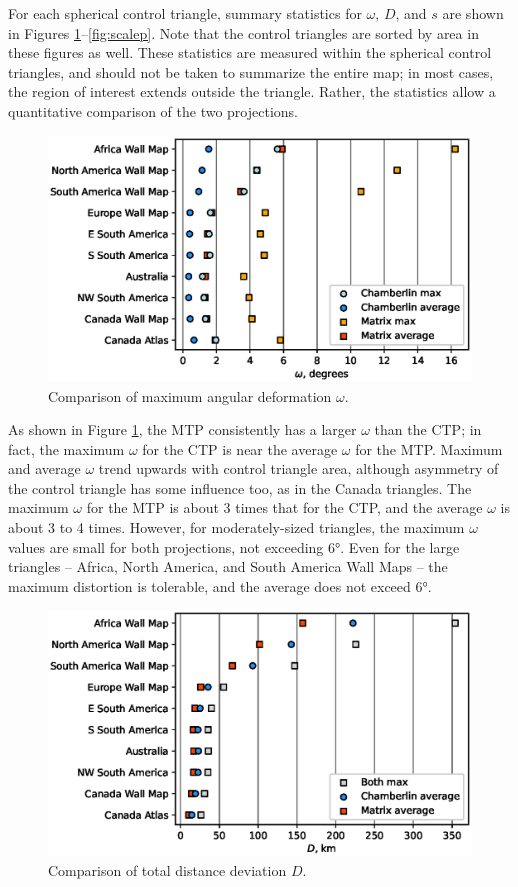 \documentclass[]{interact}
\begin{document}
For each spherical control triangle, summary statistics for $\omega$, $D$, and
$s$ are shown in Figures \ref{fig:omegap}--\ref{fig:scalep}. Note that the
control triangles are sorted by area in these figures as well.
These statistics are measured within the spherical control triangles,
and should not be taken to summarize the entire map; in most cases,
the region of interest extends outside the triangle.
Rather, the statistics allow a quantitative comparison of the two projections.

\begin{figure}
  \includegraphics[width=\textwidth]{omegaplot}
  \caption{Comparison of maximum angular deformation $\omega$.}
  \label{fig:omegap}
\end{figure}

As shown in Figure \ref{fig:omegap}, the MTP consistently has a larger $\omega$
than the CTP; in fact, the maximum $\omega$ for the CTP is near the average
$\omega$ for the MTP. Maximum and average $\omega$ trend upwards with control
triangle area, although asymmetry of the control triangle has some influence
too, as in the Canada triangles. The maximum $\omega$ for the MTP is about 3
times that for the CTP, and the average $\omega$ is about 3 to 4 times.
However, for moderately-sized triangles,
the maximum $\omega$ values are small for both projections, not exceeding 6°.
Even for the large triangles -- Africa, North America, and South America Wall
Maps -- the maximum distortion is tolerable, and the average does not exceed 6°.

\begin{figure}
  \includegraphics[width=\textwidth]{distanceplot}
  \caption{Comparison of total distance deviation $D$.}
  \label{fig:distancep}
\end{figure}
\end{document}

